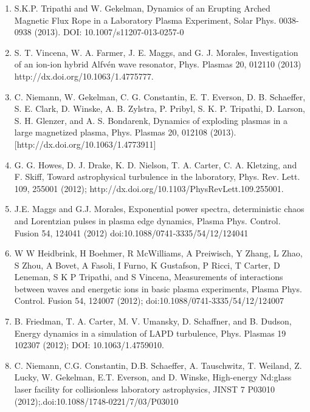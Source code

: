 \documentclass[11pt]{article}
\begin{document}
\begin{enumerate}
\item  S.K.P. Tripathi and W. Gekelman, Dynamics of an Erupting Arched Magnetic Flux Rope in a Laboratory Plasma Experiment, Solar Phys.  0038-0938 (2013). DOI: 10.1007/s11207-013-0257-0

\item   S. T. Vincena, W. A. Farmer, J. E. Maggs, and G. J. Morales, Investigation of an ion-ion hybrid Alfv\'{e}n wave resonator, Phys. Plasmas  20, 012110 (2013) http://dx.doi.org/10.1063/1.4775777.

\item   C. Niemann, W. Gekelman, C. G. Constantin, E. T. Everson, D. B. Schaeffer, S. E. Clark, D. Winske, A. B. Zylstra, P. Pribyl, S. K. P. Tripathi, D. Larson, S. H. Glenzer, and A. S. Bondarenk, Dynamics of exploding plasmas in a large magnetized plasma, Phys. Plasmas 20, 012108 (2013). [http://dx.doi.org/10.1063/1.4773911]

\item   G. G. Howes, D. J. Drake, K. D. Nielson, T. A. Carter, C. A. Kletzing, and F. Skiff, Toward astrophysical turbulence in the laboratory, Phys. Rev. Lett. 109, 255001 (2012); http://dx.doi.org/10.1103/PhysRevLett.109.255001.

\item   J.E. Maggs and G.J. Morales, Exponential power spectra, deterministic chaos and Lorentzian pulses in plasma edge dynamics, Plasma Phys. Control. Fusion  54, 124041 (2012) doi:10.1088/0741-3335/54/12/124041

\item W W Heidbrink, H Boehmer, R McWilliams, A Preiwisch, Y Zhang, L Zhao, S Zhou, A Bovet, A Fasoli, I Furno, K Gustafson, P Ricci, T Carter, D Leneman, S K P Tripathi, and S Vincena, Measurements of interactions between waves and energetic ions in basic plasma experiments, Plasma Phys. Control. Fusion 54, 124007 (2012); doi:10.1088/0741-3335/54/12/124007

\item  B. Friedman, T. A. Carter, M. V. Umansky, D. Schaffner, and B. Dudson, Energy dynamics in a simulation of LAPD turbulence, Phys. Plasmas 19 102307 (2012); DOI: 10.1063/1.4759010.

\item  C. Niemann, C.G. Constantin, D.B. Schaeffer, A. Tauschwitz, T. Weiland, Z. Lucky, W. Gekelman, E.T. Everson, and D. Winske, High-energy Nd:glass laser facility for collisionless laboratory astrophysics, JINST 7 P03010 (2012);.doi:10.1088/1748-0221/7/03/P03010


\end{enumerate}
\end{document}
